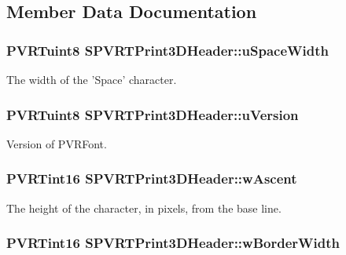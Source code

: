 \subsection{Member Data Documentation}
\hypertarget{struct_s_p_v_r_t_print3_d_header_ac2f5f0e83a1563271101fb9b87734458}{
\subsubsection[{u\+Space\+Width}]{\setlength{\rightskip}{0pt plus 5cm}P\+V\+R\+Tuint8 S\+P\+V\+R\+T\+Print3\+D\+Header\+::u\+Space\+Width}}\label{struct_s_p_v_r_t_print3_d_header_ac2f5f0e83a1563271101fb9b87734458}
The width of the 'Space' character. \hypertarget{struct_s_p_v_r_t_print3_d_header_abe62bc6b204189b0d466536be5271647}{
\subsubsection[{u\+Version}]{\setlength{\rightskip}{0pt plus 5cm}P\+V\+R\+Tuint8 S\+P\+V\+R\+T\+Print3\+D\+Header\+::u\+Version}}\label{struct_s_p_v_r_t_print3_d_header_abe62bc6b204189b0d466536be5271647}
Version of P\+V\+R\+Font. \hypertarget{struct_s_p_v_r_t_print3_d_header_a7abe89f6314f93f74e5e355ccb312fe0}{
\subsubsection[{w\+Ascent}]{\setlength{\rightskip}{0pt plus 5cm}P\+V\+R\+Tint16 S\+P\+V\+R\+T\+Print3\+D\+Header\+::w\+Ascent}}\label{struct_s_p_v_r_t_print3_d_header_a7abe89f6314f93f74e5e355ccb312fe0}
The height of the character, in pixels, from the base line. \hypertarget{struct_s_p_v_r_t_print3_d_header_aa3041948eabe110e0d5c15678f4d35ca}{
\subsubsection[{w\+Border\+Width}]{\setlength{\rightskip}{0pt plus 5cm}P\+V\+R\+Tint16 S\+P\+V\+R\+T\+Print3\+D\+Header\+::w\+Border\+Width}}\label{struct_s_p_v_r_t_print3_d_header_aa3041948eabe110e0d5c15678f4d35ca}
